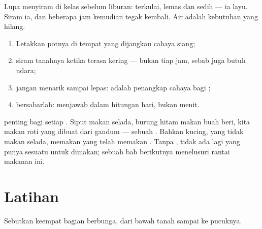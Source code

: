 \begin{example}\label{ex:g1:plants-around-us:wilt}
Lupa menyiram  di kelas sebelum liburan:  terkulai,
lemas dan sedih --- ia layu. Siram ia, dan beberapa jam kemudian
 tegak kembali. Air adalah kebutuhan yang hilang.
\end{example}

\begin{method}\label{met:g1:plants-around-us:care}
\begin{enumerate}
  \item Letakkan potnya di tempat yang dijangkau cahaya siang;
  \item siram tanahnya ketika terasa kering --- bukan tiap jam, sebab
         juga butuh udara;
  \item jangan menarik  sampai lepas:  adalah penangkap
        cahaya bagi ;
  \item bersabarlah:  menjawab dalam hitungan hari, bukan
        menit.
\end{enumerate}
\end{method}

\begin{remark}\label{rem:g1:plants-around-us:food}
 penting bagi setiap . Siput makan selada, burung hitam
makan buah beri, kita makan roti yang dibuat dari gandum --- sebuah
. Bahkan kucing, yang tidak makan selada, memakan  yang
telah memakan . Tanpa , tidak ada lagi yang punya
sesuatu untuk dimakan; sebuah bab berikutnya menelusuri rantai makanan
ini.
\end{remark}

\section{Latihan}

\begin{exercise}[$\star$]\label{exo:g1:plants-around-us:1}
Sebutkan keempat bagian  berbunga, dari bawah tanah sampai ke
pucuknya.
\end{exercise}


